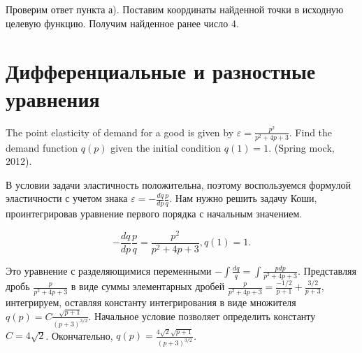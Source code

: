 \begin{problem}
\begin{sol}
Проверим ответ пункта а). Поставим координаты найденной точки в исходную целевую функцию. Получим найденное ранее число 4.
\end{sol}
\end{problem}




\section{Дифференциальные и разностные уравнения}




\begin{problem}
The point elasticity of demand for a good is given by $\varepsilon =\frac{p^{2} }{p^{2} +4p+3} $. Find the demand function $q(p)$ given the initial condition $q(1)=1$. (Spring mock, 2012).



\begin{sol}
В условии задачи эластичность положительна, поэтому воспользуемся формулой эластичности с учетом знака $\varepsilon =-\frac{dq}{dp} \frac{p}{q} $. Нам нужно решить задачу Коши, проинтегрировав уравнение первого порядка с начальным значением.

\[-\frac{dq}{dp} \frac{p}{q} =\frac{p^{2} }{p^{2} +4p+3} , q(1)=1.\]

Это уравнение с разделяющимися переменными $-\int \frac{dq}{q} =\int \frac{pdp}{p^{2} +4p+3}   $. Представляя дробь $\frac{p}{p^{2} +4p+3} $ в виде суммы элементарных дробей $\frac{p}{p^{2} +4p+3} =\frac{-1/2}{p+1} +\frac{3/2}{p+3} $, интегрируем, оставляя константу интегрирования в виде множителя $q(p)=C\frac{\sqrt{p+1} }{(p+3)^{3/2} } $. Начальное условие позволяет определить константу $C=4\sqrt{2} $. Окончательно, $q(p)=\frac{4\sqrt{2} \sqrt{p+1} }{(p+3)^{3/2} } $.
\end{sol}
\end{problem}





